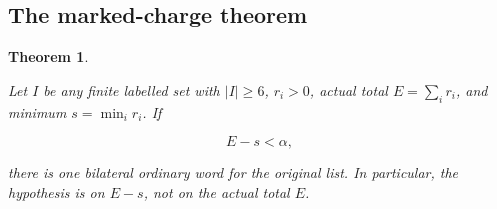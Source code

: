 \documentclass[11pt,a4paper]{article}
\newtheorem{theorem}{Theorem}
\begin{document}
\subsection{The marked-charge theorem}\label{sec:A.4}

\begin{theorem}\label{stmt:A.7}

 Let \(I\) be any finite labelled set with \(|I|\ge6\), \(r_i>0\), actual total \(E=\sum_i r_i\), and minimum \(s=\min_i r_i\). If

\begin{equation}
E-s<\alpha,
\tag{A.10}\label{eq:A.10}
\end{equation}

there is one bilateral ordinary word for the original list. In particular, the hypothesis is on \(E-s\), not on the actual total \(E\).

\end{theorem}
\end{document}
